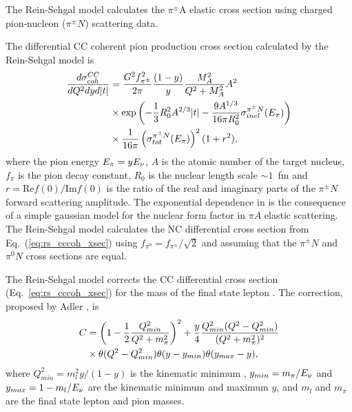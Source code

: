 The Rein-Sehgal model calculates the $\pi^{\pm}$A elastic cross section using charged pion-nucleon ($\pi^{\pm}N$)
scattering data.

The differential CC coherent pion production cross section calculated by the Rein-Sehgal model is
\begin{eqnarray}
\label{eq:rs_cccoh_xsec}
\frac{d\sigma_{coh}^{CC}}{dQ^{2} dyd|t|} &= \frac{G^{2}f_{\pi^{\pm}}^{2}}{2\pi}\frac{(1-y)}{y}\frac{M_{A}^{2}}{Q^{2} + M_{A}^{2}}A^{2} \nonumber \\
&\times \exp\left(-\frac{1}{3}R_{0}^{2}A^{2/3}|t|-\frac{9A^{1/3}}{16\pi R_{0}^{2}}\sigma_{inel}^{\pi^{\pm}N}(E_{\pi})\right)\nonumber\\
&\times \frac{1}{16\pi}\left(\sigma_{tot}^{\pi^{\pm}N}(E_{\pi})\right)^{2}(1+r^{2}),
\end{eqnarray}
where the pion energy $E_{\pi}=yE_{\nu}$, $A$ is the atomic number of the target nucleus, $f_\pi$ is the pion decay constant,
$R_0$ is the nuclear length scale $\sim 1$~fm and $r = \text{Re}f(0)/\text{Im}f(0)$ is the ratio of the real and imaginary
parts of the $\pi^{\pm}N$ forward scattering amplitude.  The exponential dependence in \tabs is the consequence of a simple
gaussian model for the nuclear form factor in $\pi A$ elastic scattering. The Rein-Sehgal model calculates the NC
differential cross section from Eq.~(\ref{eq:rs_cccoh_xsec}) using $f_{\pi^{0}} = f_{\pi^{\pm}}/\sqrt{2}$ and assuming that
the $\pi^{\pm}N$ and $\pi^{0}N$ cross sections are equal.

The Rein-Sehgal model corrects the CC differential cross section (Eq.~\ref{eq:rs_cccoh_xsec}) for the mass of the final state
lepton \cite{bib:RS2,bib:lepton_mass_corr}.  The correction, proposed by Adler \cite{bib:lepton_mass_corr}, is
\begin{eqnarray}
C &= \left(1-\frac{1}{2}\frac{Q^{2}_{min}}{Q^{2}+m^{2}_{\pi}}\right)^{2}+\frac{y}{4}\frac{Q^{2}_{min}(Q^{2}-Q^{2}_{min})}{(Q^{2}+m^{2}_{\pi})^{2}} \\
&\times \theta(Q^{2} - Q^{2}_{min})\theta(y - y_{min})\theta(y_{max} - y), \nonumber
\end{eqnarray}
where $Q^{2}_{min} = m^{2}_{l}y/(1-y)$ is the kinematic minimum \qsq, $y_{min} = m_{\pi}/E_{\nu}$ and $y_{max} = 1 - m_{l}/E_{\nu}$ are the kinematic minimum and maximum $y$, and $m_{l}$ and $m_{\pi}$ are the final state lepton and pion masses.

